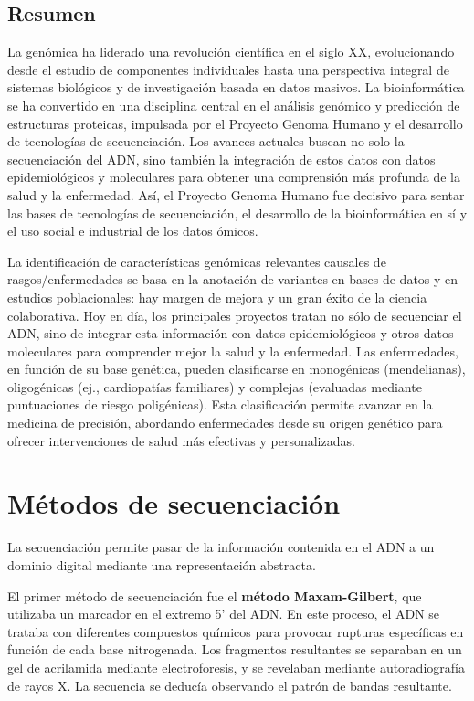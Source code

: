 \subsection{Resumen}
La genómica ha liderado una revolución científica en el siglo XX, evolucionando desde el estudio de componentes individuales hasta una perspectiva integral de sistemas biológicos y de investigación basada en datos masivos. La bioinformática se ha convertido en una disciplina central en el análisis genómico y predicción de estructuras proteicas, impulsada por el Proyecto Genoma Humano y el desarrollo de tecnologías de secuenciación. Los avances actuales buscan no solo la secuenciación del ADN, sino también la integración de estos datos con datos epidemiológicos y moleculares para obtener una comprensión más profunda de la salud y la enfermedad. Así, el Proyecto Genoma Humano fue decisivo para sentar las bases de tecnologías de secuenciación, el desarrollo de la bioinformática en sí y el uso social e industrial de los datos ómicos.

La identificación de características genómicas relevantes causales de rasgos/enfermedades se basa en la anotación de variantes en bases de datos y en estudios poblacionales: hay margen de mejora y un gran éxito de la ciencia colaborativa. Hoy en día, los principales proyectos tratan no sólo de secuenciar el ADN, sino de integrar esta información con datos epidemiológicos y otros datos moleculares para comprender mejor la salud y la enfermedad.
Las enfermedades, en función de su base genética, pueden clasificarse en monogénicas (mendelianas), oligogénicas (ej., cardiopatías familiares) y complejas (evaluadas mediante puntuaciones de riesgo poligénicas). Esta clasificación permite avanzar en la medicina de precisión, abordando enfermedades desde su origen genético para ofrecer intervenciones de salud más efectivas y personalizadas.

\section{Métodos de secuenciación}
La secuenciación permite pasar de la información contenida en el ADN a un dominio digital mediante una representación abstracta. 

El primer método de secuenciación fue el \textbf{método Maxam-Gilbert}, que utilizaba un marcador en el extremo 5' del ADN. En este proceso, el ADN se trataba con diferentes compuestos químicos para provocar rupturas específicas en función de cada base nitrogenada. Los fragmentos resultantes se separaban en un gel de acrilamida mediante electroforesis, y se revelaban mediante autoradiografía de rayos X. La secuencia se deducía observando el patrón de bandas resultante.


